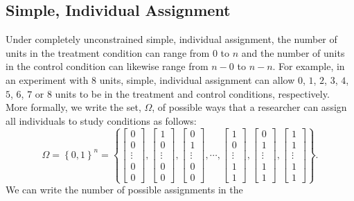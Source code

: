 \documentclass[12pt,leqno]{article}
\theoremstyle{newstyle}
\begin{document}
\hypertarget{simple-individual-assignment}{%
\subsection{Simple, Individual
Assignment}\label{simple-individual-assignment}}

Under completely unconstrained simple, individual assignment, the number
of units in the treatment condition can range from \(0\) to \(n\) and
the number of units in the control condition can likewise range from
\(n - 0\) to \(n - n\). For example, in an experiment with \(8\) units,
simple, individual assignment can allow \(0\), \(1\), \(2\), \(3\),
\(4\), \(5\), \(6\), \(7\) or \(8\) units to be in the treatment and
control conditions, respectively. More formally, we write the set,
\(\Omega\), of possible ways that a researcher can assign all
individuals to study conditions as follows: \begin{equation}
  \Omega = \left\{0, 1\right\}^n =
  \left\{
    \begin{bmatrix} 0 \\ 0 \\ \vdots \\ 0 \\ 0 \end{bmatrix},
    \begin{bmatrix} 1 \\ 0 \\ \vdots \\ 0 \\ 0 \end{bmatrix},
    \begin{bmatrix} 0 \\ 1 \\ \vdots \\ 0 \\ 0 \end{bmatrix},
    \cdots ,
    \begin{bmatrix} 1 \\ 0 \\ \vdots \\ 1 \\ 1 \end{bmatrix},
    \begin{bmatrix} 0 \\ 1 \\ \vdots \\ 1 \\ 1 \end{bmatrix},
    \begin{bmatrix} 1 \\ 1 \\ \vdots \\ 1 \\ 1 \end{bmatrix}
  \right\}.
  \label{eq: omega simple assignment}
\end{equation} We can write the number of possible assignments in the
\end{document}
